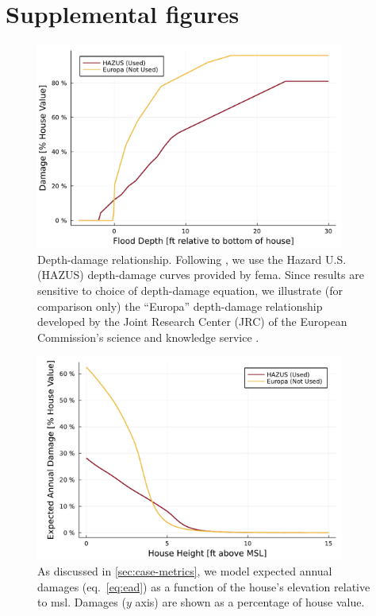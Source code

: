\documentclass[11pt]{article}
\begin{document}
\section{Supplemental figures}

\begin{figure}
    \centering
    \includegraphics[width=4in]{cost-depth-damage}
    \caption{
        Depth-damage relationship.
        Following \citet{zarekarizi_suboptimal:2020}, we use the Hazard U.S. (HAZUS) depth-damage curves provided by \gls{fema}.
        Since results are sensitive to choice of depth-damage equation, we illustrate (for comparison only) the ``Europa'' depth-damage relationship developed by the Joint Research Center (JRC) of the European Commission's science and knowledge service \citep{huizinga_depthdamage:2016}.
    }\label{fig:cost-depth-damage}
\end{figure}

\begin{figure}
    \centering
    \includegraphics[width=4in]{cost-expected-damage-emulator}
    \caption{
        As discussed in \cref{sec:case-metrics}, we model expected annual damages (eq.~\ref{eq:ead}) as a function of the house's elevation relative to \gls{msl}.
        Damages ($y$ axis) are shown as a percentage of house value.
    }\label{fig:cost-expected-damage-emulator}
\end{figure}
\end{document}
